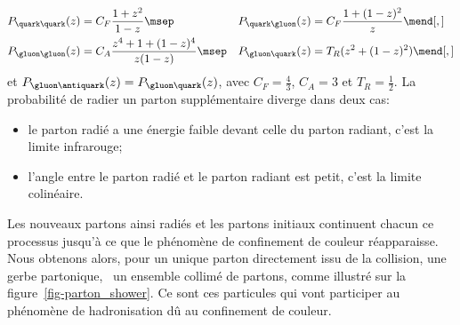 \begin{align}
P_{\quark\quark}(z) &= C_F \frac{1+z^2}{1-z} \msep&
P_{\quark\gluon}(z) &= C_F \frac{1+(1-z)^2}{z} \mend[,]
\\
P_{\gluon\gluon}(z) &= C_A \frac{z^4 + 1 + (1-z)^4}{z(1-z)} \msep&
P_{\gluon\quark}(z) &= T_R (z^2+(1-z)^2) \mend[,]
\end{align}
et $P_{\gluon\antiquark}(z) = P_{\gluon\quark}(z)$,
avec
$C_F=\frac{4}{3}$,
$C_A = 3$ et
$T_R=\frac{1}{2}$.
La probabilité de radier un parton supplémentaire diverge dans deux cas:
\begin{itemize}
\item le parton radié a une énergie faible devant celle du parton radiant, c'est la limite infrarouge;
\item l'angle entre le parton radié et le parton radiant est petit, c'est la limite colinéaire.
\end{itemize}
\par Les nouveaux partons ainsi radiés et les partons initiaux continuent chacun ce processus jusqu'à ce que le phénomène de confinement de couleur réapparaisse. Nous obtenons alors, pour un unique parton directement issu de la collision, une gerbe partonique, \ie\ un ensemble collimé de partons, comme illustré sur la figure~\ref{fig-parton_shower}.
Ce sont ces particules qui vont participer au phénomène de hadronisation dû au confinement de couleur.
